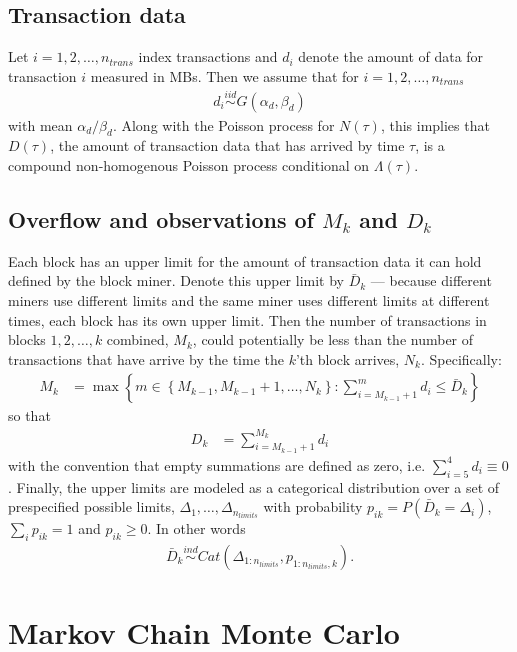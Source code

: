 \documentclass{article}
\begin{document}
\subsection{Transaction data}
Let $i=1,2,\dots,n_{trans}$ index transactions and $d_i$ denote the amount of data for transaction $i$ measured in MBs. Then we assume that for $i=1,2,\dots,n_{trans}$
\begin{align*}
d_i \stackrel{iid}{\sim} G(\alpha_d,\beta_d)
\end{align*}
with mean $\alpha_d/\beta_d$. Along with the Poisson process for $N(\tau)$, this implies that $D(\tau)$, the amount of transaction data that has arrived by time $\tau$, is a compound non-homogenous Poisson process conditional on $\Lambda(\tau)$.

\subsection{Overflow and observations of $M_k$ and $D_k$}
Each block has an upper limit for the amount of transaction data it can hold defined by the block miner. Denote this upper limit by $\bar{D}_k$ --- because different miners use different limits and the same miner uses different limits at different times, each block has its own upper limit. Then the number of transactions in blocks $1,2,\dots,k$ combined, $M_k$, could potentially be less than the number of transactions that have arrive by the time the $k$'th block arrives, $N_k$. Specifically:
\begin{align*}
M_k &= \max\left\{m\in\left\{M_{k-1}, M_{k-1} + 1, \dots, N_k\right\}: \sum_{i = M_{k-1} + 1}^m d_i \le \bar{D}_k\right\}
\end{align*}
so that
\begin{align*}
D_k &= \sum_{i = M_{k-1} + 1}^{M_k} d_i
\end{align*}
with the convention that empty summations are defined as zero, i.e. $\sum_{i=5}^4d_i \equiv 0$. Finally, the upper limits are modeled as a categorical distribution over a set of prespecified possible limits, $\Delta_1,\dots,\Delta_{n_{limits}}$ with probability $p_{ik} = P(\bar{D}_k = \Delta_i)$, $\sum_ip_{ik} = 1$ and $p_{ik} \ge 0$. In other words
\begin{align*}
\bar{D}_k\stackrel{ind}{\sim} Cat(\Delta_{1:n_{limits}}, p_{1:n_{limits},k}).
\end{align*}

\section{Markov Chain Monte Carlo}\label{sec:mcmc}
\end{document}
